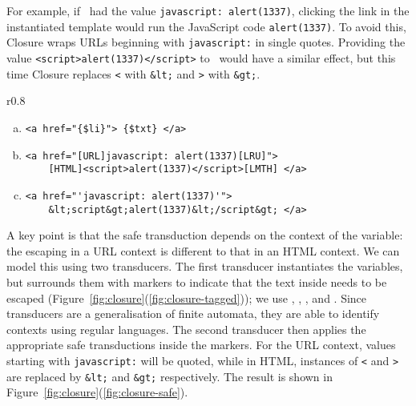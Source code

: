 For example, if \linkvar\ had the value \texttt{javascript: alert(1337)}, clicking the link in the instantiated template would run the JavaScript code \texttt{alert(1337)}.
To avoid this, Closure wraps URLs beginning with \texttt{javascript:} in single quotes.
Providing the value \texttt{<script>alert(1337)</script>} to \linktextvar\ would have a similar effect, but this time Closure replaces \texttt{<} with \texttt{\&lt;} and \texttt{>} with \texttt{\&gt;}.
%
\begin{wrapfigure}{r}{0.8\textwidth}
\begin{center}
    \vspace*{-6ex}
\begin{minipage}{\linewidth}
\begin{enumerate}[(a)]
\item \label{fig:closure-eg}
\begin{verbatim}
<a href="{$li}"> {$txt} </a>
\end{verbatim}
\item \label{fig:closure-tagged}
\begin{verbatim}
<a href="[URL]javascript: alert(1337)[LRU]">
    [HTML]<script>alert(1337)</script>[LMTH] </a>
\end{verbatim}
\item \label{fig:closure-safe}
\begin{verbatim}
<a href="'javascript: alert(1337)'">
    &lt;script&gt;alert(1337)&lt;/script&gt; </a>
\end{verbatim}
\end{enumerate}
\end{minipage}
\end{center}
\vspace{-3ex}
\caption{\label{fig:closure}A simple template (\ref{fig:closure-eg}) with two transduction steps (\ref{fig:closure-tagged}, \ref{fig:closure-safe}).}
\vspace{-5ex}
\end{wrapfigure}
A key point is that the safe transduction depends on the context of the variable:
the escaping in a URL context is different to that in an HTML context.
We can model this using two transducers.
The first transducer instantiates the variables, but surrounds them with markers to indicate that the text inside needs to be escaped
(Figure~\ref{fig:closure}(\ref{fig:closure-tagged}));
we use \urlstarttag, \urlendtag, \htmlstarttag, and \htmlendtag.
Since transducers are a generalisation of finite automata, they are able to identify contexts using regular languages. The second transducer then applies the appropriate safe transductions inside the markers.
For the URL context, values starting with \texttt{javascript:} will be quoted, while in HTML, instances of \texttt{<} and \texttt{>} are replaced by \texttt{\&lt;} and \texttt{\&gt;} respectively.
The result is shown in Figure~\ref{fig:closure}(\ref{fig:closure-safe}).

